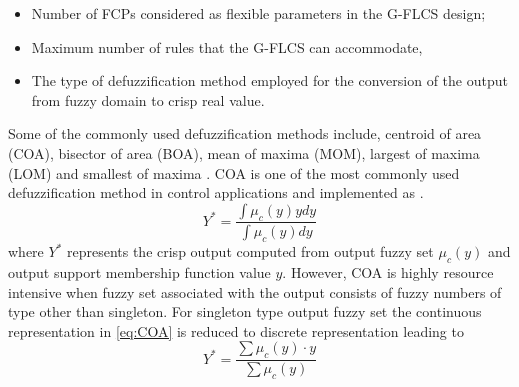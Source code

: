 \begin{itemize}
	\item Number of FCPs considered as flexible parameters in the G\hyp{}FLCS  design;
	\item Maximum number of rules that the G\hyp{}FLCS can accommodate,
	\item The type of defuzzification method employed for the conversion of the output from fuzzy domain to crisp real value.
\end{itemize}
\par
Some of the commonly used defuzzification methods include, centroid of area (COA), bisector of area (BOA), mean of maxima (MOM), largest of maxima (LOM) and smallest of maxima \cite{Ross2010}. COA is one of the most commonly used defuzzification method in control applications and implemented as \cite{Grigorie2011}.
\begin{equation} \label{eq:COA}
Y^* = \frac{{\int {{\mu _c}(y)ydy} }}{{\int {{\mu _c}(y)dy}}}
\end{equation}
where $ Y^* $ represents the crisp output computed from output fuzzy set $ {\mu _c}(y) $ and output support membership function value $ y $. 
However, COA is highly resource intensive when fuzzy set associated with the output consists of fuzzy numbers of type other than singleton. For singleton type output fuzzy set the continuous representation in \eqref{eq:COA} is reduced to discrete representation leading to \cite{Ross2010} 
\[{Y^*} = \frac{{\sum {{\mu _c}(y) \cdot y} }}{{\sum {{\mu _c}(y)} }}\]
